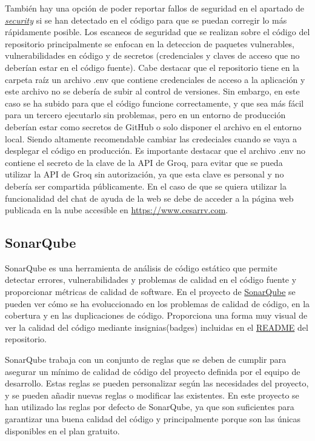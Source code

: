 También hay una opción de poder reportar fallos de seguridad en el apartado de \href{https://github.com/CesarRodrigu/GII-24.19-contramedidas-IoT-mediante-reinforcement-learning/security}{\textit{security}} si se han detectado en el código para que se puedan corregir lo más rápidamente posible.
Los escaneos de seguridad que se realizan sobre el código del repositorio principalmente se enfocan en la deteccion de paquetes vulnerables, vulnerabilidades en código y de secretos (credenciales y claves de acceso que no deberían estar en el código fuente).
Cabe destacar que el repositorio tiene en la carpeta raíz un archivo .env que contiene credenciales de acceso a la aplicación y este archivo no se debería de subir al control de versiones. Sin embargo, en este caso se ha subido para que el código funcione correctamente, y que sea más fácil para un tercero ejecutarlo sin problemas, pero en un entorno de producción deberían estar como secretos de GitHub o solo disponer el archivo en el entorno local. Siendo altamente recomendable cambiar las credeciales cuando se vaya a desplegar el código en producción.
Es importante destacar que el archivo .env no contiene el secreto de la clave de la API de Groq, para evitar que se pueda utilizar la API de Groq sin autorización, ya que esta clave es personal y no debería ser compartida públicamente. En el caso de que se quiera utilizar la funcionalidad del chat de ayuda de la web se debe de acceder a la página web publicada en la nube accesible en \url{https://www.cesarrv.com}.

\subsection{SonarQube}
\label{subsec:sonarqube}
SonarQube es una herramienta de análisis de código estático que permite detectar errores, vulnerabilidades y problemas de calidad en el código fuente y proporcionar métricas de calidad de software. En el proyecto de \href{https://sonarcloud.io/project/overview?id=CesarRodrigu_GII-24.19-contramedidas-IoT-mediante-reinforcement-learning}{SonarQube} se pueden ver cómo se ha evoluccionado en los problemas de calidad de código, en la cobertura y en las duplicaciones de código. Proporciona una forma muy visual de ver la calidad del código mediante insignias(badges) incluidas en el \href{https://github.com/CesarRodrigu/GII-24.19-contramedidas-IoT-mediante-reinforcement-learning/blob/main/README.md}{README} del repositorio.

SonarQube trabaja con un conjunto de reglas que se deben de cumplir para asegurar un mínimo de calidad de código del proyecto definida por el equipo de desarrollo. Estas reglas se pueden personalizar según las necesidades del proyecto, y se pueden añadir nuevas reglas o modificar las existentes. En este proyecto se han utilizado las reglas por defecto de SonarQube, ya que son suficientes para garantizar una buena calidad del código y principalmente porque son las únicas disponibles en el plan gratuito.


